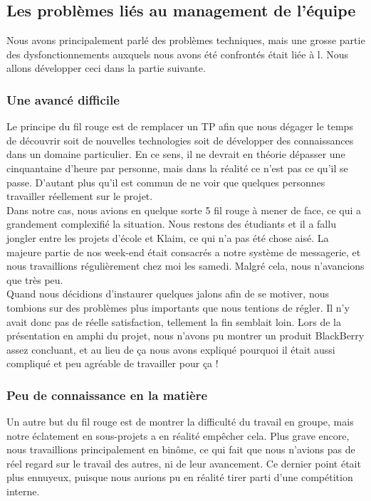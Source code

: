 \documentclass{article}
\begin{document}
	\subsection{Les problèmes liés au management de l'équipe}

	Nous avons principalement parlé des problèmes techniques, mais une grosse partie des dysfonctionnements auxquels nous avons été confrontés était liée à l. Nous allons développer ceci dans la partie suivante. 
	
		\subsubsection{Une avancé difficile}
		Le principe du fil rouge est de remplacer un TP afin que nous dégager le temps de découvrir soit de nouvelles technologies soit de développer des connaissances dans un domaine particulier. En ce sens, il ne devrait en théorie dépasser une cinquantaine d'heure par personne, mais dans la réalité ce n'est pas ce qu'il se passe. D'autant plus qu'il est commun de ne voir que quelques personnes travailler réellement sur le projet. \\
		
		Dans notre cas, nous avions en quelque sorte 5 fil rouge à mener de face, ce qui a grandement complexifié la situation. Nous restons des étudiants et il a fallu jongler entre les projets d'école et Klaim, ce qui n'a pas été chose aisé. La majeure partie de nos week-end était consacrés a notre système de messagerie, et nous travaillions régulièrement chez moi les samedi. Malgré cela, nous n'avancions que très peu.\\ 
		
		Quand nous décidions d'instaurer quelques jalons afin de se motiver, nous tombions sur des problèmes plus importants que nous tentions de régler. Il n'y avait donc pas de réelle satisfaction, tellement la fin semblait loin. Lors de la présentation en amphi du projet, nous n'avons pu montrer un produit BlackBerry assez concluant, et au lieu de ça nous avons expliqué pourquoi il était aussi compliqué et peu agréable de travailler pour ça ! \\
		
		\subsubsection{Peu de connaissance en la matière}
		Un autre but du fil rouge est de montrer la difficulté du travail en groupe, mais notre éclatement en sous-projets a en réalité empêcher cela. Plus grave encore, nous travaillions principalement en binôme, ce qui fait que nous n'avions pas de réel regard sur le travail des autres, ni de leur avancement. Ce dernier point était plus ennuyeux, puisque nous aurions pu en réalité tirer parti d'une compétition interne. \\
		
\end{document}
